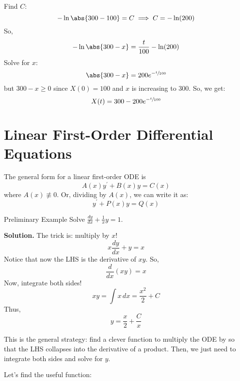 Find $ C $: \[ -\ln\abs{300-100}=C\implies C=-\ln(200) \]
So,
\[ -\ln\abs{300-x}=\frac{t}{100}-\ln(200) \]
Solve for $ x $:
\[ \abs{300-x}=200e^{-\sfrac{t}{100}} \]
but $ 300-x\geqslant 0 $ since $ X(0)=100 $ and $ x $ is increasing
to 300. So, we get:
\[ X(t)=300-200e^{-\sfrac{t}{100}} \]

\section{Linear First-Order Differential Equations}
The general form for a linear first-order ODE is
\[ A(x)y^\prime+B(x)y=C(x) \]
where $ A(x)\not\equiv 0 $. Or, dividing by $ A(x) $, we can write it as:
\[ y^\prime+P(x)y=Q(x) \]
\begin{Example}{Preliminary Example}{}
    Solve
    $ \frac{dy}{dx} +\frac{1}{x} y=1 $.

    \textbf{Solution.}
    The trick is: multiply by $ x $!
    \[ x \frac{dy}{dx} +y=x \]
    Notice that now the LHS is the derivative of $ xy $. So,
    \[ \frac{d}{dx} (xy)=x \]
    Now, integrate both sides!
    \[ xy=\int x\, d{x}=\frac{x^2}{2} +C \]
    Thus,
    \[ y=\frac{x}{2} +\frac{C}{x} \]
\end{Example}
This is the general strategy: find a clever function to multiply
the ODE by so that the LHS collapses into the derivative of a product.
Then, we just need to integrate both sides and solve for $ y $.

Let's find the useful function:

